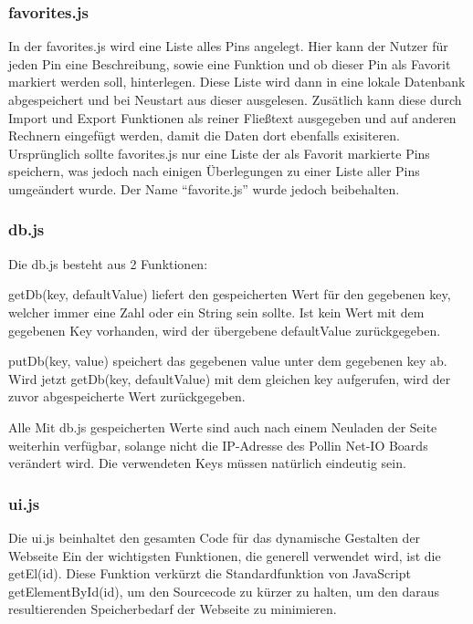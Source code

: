 \subsubsection{favorites.js}

In der favorites.js wird eine Liste alles Pins angelegt. Hier kann der Nutzer für jeden Pin eine
Beschreibung, sowie eine Funktion und ob dieser Pin als Favorit markiert werden soll, 
hinterlegen. Diese Liste wird dann in eine lokale Datenbank abgespeichert und bei Neustart aus dieser ausgelesen. 
Zusätlich kann diese durch Import und Export Funktionen als reiner Fließtext ausgegeben und auf anderen Rechnern 
eingefügt werden, damit die Daten dort ebenfalls exisiteren.\\
Ursprünglich sollte favorites.js nur eine Liste der als Favorit markierte Pins speichern, 
was jedoch nach einigen Überlegungen zu einer Liste aller Pins umgeändert wurde. Der Name 
"`favorite.js"' wurde jedoch beibehalten.

\subsubsection{db.js}
Die \textrm{db.js} besteht aus 2 Funktionen: 

\textrm{getDb(key, defaultValue)} liefert den gespeicherten Wert für den
gegebenen \textrm{key}, welcher immer eine Zahl oder ein String sein sollte. Ist
kein Wert mit dem gegebenen Key vorhanden, wird der
übergebene \textrm{defaultValue} zurückgegeben.

\textrm{putDb(key, value)} speichert das gegebenen \textrm{value} unter dem
gegebenen \textrm{key} ab. Wird jetzt \textrm{getDb(key, defaultValue)} mit dem
gleichen \textrm{key} aufgerufen, wird der zuvor abgespeicherte Wert
zurückgegeben.

Alle Mit \textrm{db.js} gespeicherten Werte sind auch nach einem Neuladen der
Seite weiterhin verfügbar, solange nicht die IP-Adresse des Pollin Net-IO Boards
verändert wird. Die verwendeten Keys müssen natürlich eindeutig sein.

\subsubsection{ui.js}
Die \textrm{ui.js} beinhaltet den gesamten Code für das dynamische Gestalten der
Webseite\newline
Ein der wichtigsten Funktionen, die generell verwendet wird, ist die
\textrm{getEl(id)}.
Diese Funktion verkürzt die Standardfunktion von JavaScript
\textrm{getElementById(id)}, um den Sourcecode zu kürzer zu halten,
um den daraus resultierenden Speicherbedarf der Webseite zu
minimieren.\newline

